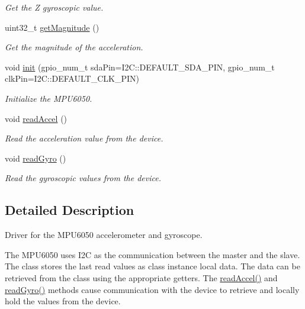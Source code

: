 \begin{DoxyCompactItemize}
\begin{DoxyCompactList}\small\item\em Get the Z gyroscopic value. \end{DoxyCompactList}\item 
uint32\+\_\+t \hyperlink{class_m_p_u6050_a024dfc449b29fb0adac8455950b1010d}{get\+Magnitude} ()
\begin{DoxyCompactList}\small\item\em Get the magnitude of the acceleration. \end{DoxyCompactList}\item 
void \hyperlink{class_m_p_u6050_a5913e4a643511aae3c8a7f407cac86e4}{init} (gpio\+\_\+num\+\_\+t sda\+Pin=I2\+C\+::\+D\+E\+F\+A\+U\+L\+T\+\_\+\+S\+D\+A\+\_\+\+P\+IN, gpio\+\_\+num\+\_\+t clk\+Pin=I2\+C\+::\+D\+E\+F\+A\+U\+L\+T\+\_\+\+C\+L\+K\+\_\+\+P\+IN)
\begin{DoxyCompactList}\small\item\em Initialize the M\+P\+U6050. \end{DoxyCompactList}\item 
void \hyperlink{class_m_p_u6050_ad4e58ad436a52f96e7172e7081fe9afb}{read\+Accel} ()
\begin{DoxyCompactList}\small\item\em Read the acceleration value from the device. \end{DoxyCompactList}\item 
void \hyperlink{class_m_p_u6050_a2514ae2158f5b87c8267242077ddd0ec}{read\+Gyro} ()
\begin{DoxyCompactList}\small\item\em Read the gyroscopic values from the device. \end{DoxyCompactList}\end{DoxyCompactItemize}


\subsection{Detailed Description}
Driver for the M\+P\+U6050 accelerometer and gyroscope. 

The M\+P\+U6050 uses I2C as the communication between the master and the slave. The class stores the last read values as class instance local data. The data can be retrieved from the class using the appropriate getters. The \hyperlink{class_m_p_u6050_ad4e58ad436a52f96e7172e7081fe9afb}{read\+Accel()} and \hyperlink{class_m_p_u6050_a2514ae2158f5b87c8267242077ddd0ec}{read\+Gyro()} methods cause communication with the device to retrieve and locally hold the values from the device.

